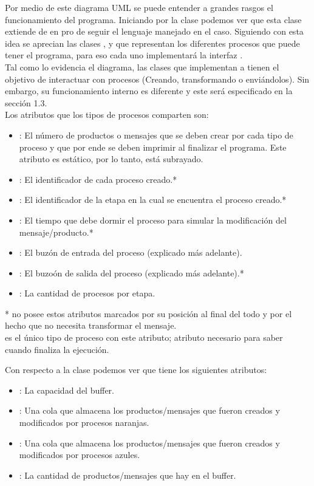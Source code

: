 \documentclass[a4paper]{article}
\begin{document}
    Por medio de este diagrama UML se puede entender a grandes rasgos el funcionamiento del programa.
    Iniciando por la clase  podemos ver que esta clase extiende de  en pro de seguir el lenguaje manejado en el caso.
    Siguiendo con esta idea se aprecian las clases ,  y  que representan los diferentes procesos que puede tener el programa, para eso cada uno implementar\'a la interfaz .\\
    Tal como lo evidencia el diagrama, las clases que implementan a  tienen el objetivo de interactuar con procesos (Creando, transformando o envi\'andolos).
    Sin embargo, su funcionamiento interno es diferente y este ser\'a especificado en la secci\'on 1.3.\\
    Los atributos que los tipos de procesos comparten son:
    \begin{itemize}
        \item {}: El n\'umero de productos o mensajes que se deben crear por cada tipo de proceso y que por ende se deben imprimir al finalizar el programa.
        Este atributo es est\'atico, por lo tanto, est\'a subrayado.
        \item {}: El identificador de cada proceso creado.*
        \item {}: El identificador de la etapa en la cual se encuentra el proceso creado.*
        \item {}: El tiempo que debe dormir el proceso para simular la modificaci\'on del mensaje/producto.*
        \item {}: El buz\'on de entrada del proceso (explicado m\'as adelante).
        \item {}: El buzo\'on de salida del proceso (explicado m\'as adelante).*
        \item[\textbullet] : La cantidad de procesos por etapa.
    \end{itemize}
    \small{*  no posee estos atributos marcados por su posici\'on al final del todo y por el hecho que no necesita transformar el mensaje.}\\
    \small{\textbullet {} es el \'unico tipo de proceso con este atributo; atributo necesario para saber cuando finaliza la ejecuci\'on.}

    Con respecto a la clase  podemos ver que tiene los siguientes atributos:
    \begin{itemize}
        \item {}: La capacidad del buffer.
        \item {}: Una cola que almacena los productos/mensajes que fueron creados y modificados por procesos naranjas.
        \item {}: Una cola que almacena los productos/mensajes que fueron creados y modificados por procesos azules.
        \item {}: La cantidad de productos/mensajes que hay en el buffer.
    \end{itemize}
\end{document}
